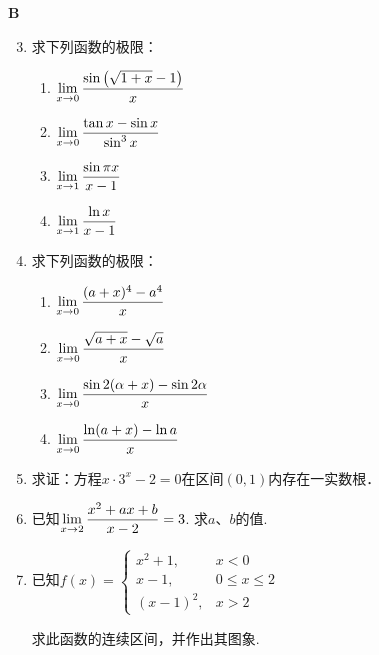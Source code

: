 \begin{center}
    \bfseries B
\end{center}

\begin{enumerate}\setcounter{enumi}{2}

\item 求下列函数的极限：
\begin{multicols}{2}
\begin{enumerate}[(1)]
\item $\lim\limits_{x\to 0} \dfrac{\sin\left(\sqrt{1+x}-1\right)}{x}$
\item $\lim\limits_{x\to 0} \dfrac{\tan x-\sin x}{\sin^3 x}$
\item $\lim\limits_{x\to 1} \dfrac{\sin \pi x}{x-1}$
\item $\lim\limits_{x\to 1} \dfrac{\ln x}{x-1}$
\end{enumerate}
\end{multicols}


\item 求下列函数的极限：
\begin{multicols}{2}
\begin{enumerate}[(1)]
    \item $\lim\limits_{x\to 0} \dfrac{(a+x)^4-a^4}{x}$
    \item $\lim\limits_{x\to 0} \dfrac{\sqrt{a+x}-\sqrt{a}}{x}$
    \item $\lim\limits_{x\to 0} \dfrac{\sin 2(\alpha+x)-\sin 2\alpha}{x}$
    \item $\lim\limits_{x\to 0} \dfrac{\ln(a+x)-\ln a}{x}$
\end{enumerate}
\end{multicols}

\item 求证：方程$x\cdot 3^x-2=0$在区间$(0,1)$内存在一实数根．
\item 已知$\lim\limits_{x\to 2} \dfrac{x^2+ax+b}{x-2}=3$. 求$a$、$b$的值.
\item 已知$f(x)=\begin{cases}
    x^2+1, & x<0\\
    x-1,& 0\le x\le 2\\
    (x-1)^2, & x>2
\end{cases}$

求此函数的连续区间，并作出其图象.








\end{enumerate}

